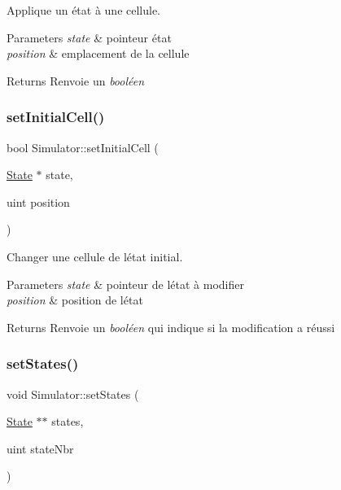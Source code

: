 Applique un état à une cellule. 


\begin{DoxyParams}{Parameters}
{\em state} & pointeur état \\
\hline
{\em position} & emplacement de la cellule \\
\hline
\end{DoxyParams}
\begin{DoxyReturn}{Returns}
Renvoie un {\itshape booléen} 
\end{DoxyReturn}
\mbox{\label{class_simulator_ace1160cbeb97c0f0ad782e956c64d55d}} 
\subsubsection{\texorpdfstring{set\+Initial\+Cell()}{setInitialCell()}}
{\footnotesize\ttfamily bool Simulator\+::set\+Initial\+Cell (\begin{DoxyParamCaption}\item[{\mbox{\hyperlink{class_state}{State}} $\ast$}]{state,  }\item[{uint}]{position }\end{DoxyParamCaption})}



Changer une cellule de l\textquotesingle{}état initial. 


\begin{DoxyParams}{Parameters}
{\em state} & pointeur de l\textquotesingle{}état à modifier \\
\hline
{\em position} & position de l\textquotesingle{}état \\
\hline
\end{DoxyParams}
\begin{DoxyReturn}{Returns}
Renvoie un {\itshape booléen} qui indique si la modification a réussi 
\end{DoxyReturn}
\mbox{\label{class_simulator_a6d17e095b5ad3dc418907f96bf61a226}} 
\subsubsection{\texorpdfstring{set\+States()}{setStates()}}
{\footnotesize\ttfamily void Simulator\+::set\+States (\begin{DoxyParamCaption}\item[{\mbox{\hyperlink{class_state}{State}} $\ast$$\ast$}]{states,  }\item[{uint}]{state\+Nbr }\end{DoxyParamCaption})}




